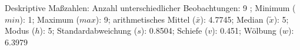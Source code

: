 				\label{tableValues:bsch15b}
				\vspace*{-\baselineskip}
                    \begin{noten}
                	    \note{} Deskriptive Maßzahlen:
                	    Anzahl unterschiedlicher Beobachtungen: 9%
                	    ; 
                	      Minimum ($min$): 1; 
                	      Maximum ($max$): 9; 
                	      arithmetisches Mittel ($\bar{x}$): \num[round-mode=places,round-precision=2]{4.7745}; 
                	      Median ($\tilde{x}$): 5; 
                	      Modus ($h$): 5; 
                	      Standardabweichung ($s$): \num[round-mode=places,round-precision=2]{0.8504}; 
                	      Schiefe ($v$): \num[round-mode=places,round-precision=2]{0.451}; 
                	      Wölbung ($w$): \num[round-mode=places,round-precision=2]{6.3979}
                     \end{noten}

